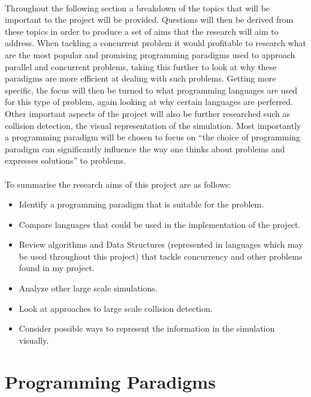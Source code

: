 \documentclass[main.tex]{subfiles}
\begin{document}
\paragraph{}Throughout the following section a breakdown of the topics that will be important to the project will be provided. Questions will then be derived from these topics in order to produce a set of aims that the research will aim to address. When tackling a concurrent problem it would profitable to research what are the most popular and promising programming paradigms used to approach parallel and concurrent problems, taking this further to look at why these paradigms are more efficient at dealing with such problems. Getting more specific, the focus will then be turned to what programming languages are used for this type of problem, again looking at why certain languages are perferred. Other important aspects of the project will also be further researched such as collision detection, the visual representation of the simulation. Most importantly a programming paradigm will be chosen to focus on ``the choice of programming paradigm can significantly influence the way one thinks about problems and expresses solutions'' to problems. \cite{Curriculum2008}

\paragraph{}To summarise the research aims of this project are as follows:
\begin{itemize}
	\item Identify a programming paradigm that is suitable for the problem.
	\item Compare languages that could be used in the implementation of the project.
	\item Review algorithms and Data Structures (represented in languages which may be used throughout this project) that tackle concurrency and other problems found in my project.
	\item Analyze other large scale simulations.
	\item Look at approaches to large scale collision detection.
	\item Consider possible ways to represent the information in the simulation visually.
\end{itemize}


\section{Programming Paradigms}
\end{document}
